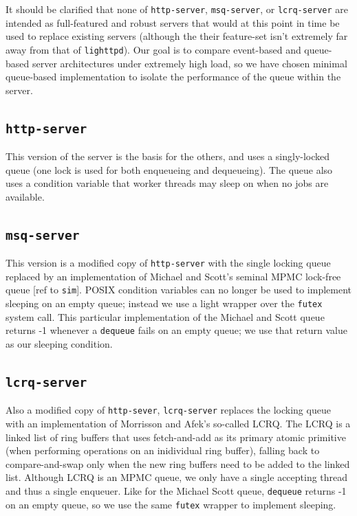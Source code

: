 \documentclass[twoside]{article}
\begin{document}
\begin{multicols}{2}
It should be clarified that none of \verb+http-server+,
\verb+msq-server+, or \verb+lcrq-server+ are intended as full-featured
and robust servers that would at this point in time be used to replace
existing servers (although the their feature-set isn't extremely far
away from that of \verb+lighttpd+). Our goal is to compare event-based
and queue-based server architectures under extremely high load, so we
have chosen minimal queue-based implementation to isolate the
performance of the queue within the server.

\subsection{\texttt{http-server}}

This version of the server is the basis for the others, and uses a
singly-locked queue (one lock is used for both enqueueing and
dequeueing). The queue also uses a condition variable that worker
threads may sleep on when no jobs are available.

\subsection{\texttt{msq-server}}

This version is a modified copy of \verb+http-server+ with the single
locking queue replaced by an implementation of Michael and Scott's
seminal MPMC lock-free queue [ref to \verb+sim+]. POSIX
condition variables can no longer be used to implement sleeping on an
empty queue; instead we use a light wrapper over the \verb+futex+ system
call. This particular implementation of the Michael and Scott queue
returns -1 whenever a \verb+dequeue+ fails on an empty queue; we use that
return value as our sleeping condition.

\subsection{\texttt{lcrq-server}}

Also a modified copy of \verb+http-sever+, \verb+lcrq-server+ replaces
the locking queue with an implementation of Morrisson and Afek's
so-called LCRQ. The LCRQ is a linked list of ring buffers that uses
fetch-and-add as its primary atomic primitive (when performing
operations on an inidividual ring buffer), falling back to
compare-and-swap only when the new ring buffers need to be added to
the linked list. Although LCRQ is an MPMC queue, we only have a single
accepting thread and thus a single enqueuer. Like for the Michael
Scott queue, \verb+dequeue+ returns -1 on an empty queue, so we use
the same \verb+futex+ wrapper to implement sleeping.


\end{multicols}
\end{document}
